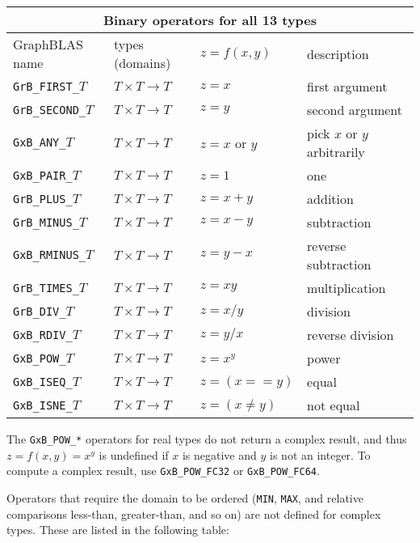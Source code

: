 \documentclass[12pt]{article}
\begin{document}
\vspace{0.2in}
{\footnotesize
\begin{tabular}{|llll|}
\hline
\multicolumn{4}{|c|}{Binary operators for all 13 types} \\
\hline
GraphBLAS name        & types (domains)            & $z=f(x,y)$      & description \\
\hline
\verb'GrB_FIRST_'$T$  & $T \times T \rightarrow T$ & $z = x$         & first argument \\
\verb'GrB_SECOND_'$T$ & $T \times T \rightarrow T$ & $z = y$         & second argument \\
\verb'GxB_ANY_'$T$    & $T \times T \rightarrow T$ & $z = x$ or $y$  & pick $x$ or $y$ arbitrarily \\
\verb'GxB_PAIR_'$T$   & $T \times T \rightarrow T$ & $z = 1$         & one \\
\verb'GrB_PLUS_'$T$   & $T \times T \rightarrow T$ & $z = x+y$       & addition \\
\verb'GrB_MINUS_'$T$  & $T \times T \rightarrow T$ & $z = x-y$       & subtraction \\
\verb'GxB_RMINUS_'$T$ & $T \times T \rightarrow T$ & $z = y-x$       & reverse subtraction \\
\verb'GrB_TIMES_'$T$  & $T \times T \rightarrow T$ & $z = xy$        & multiplication \\
\verb'GrB_DIV_'$T$    & $T \times T \rightarrow T$ & $z = x/y$       & division \\
\verb'GxB_RDIV_'$T$   & $T \times T \rightarrow T$ & $z = y/x$       & reverse division \\
\verb'GxB_POW_'$T$    & $T \times T \rightarrow T$ & $z = x^y$       & power \\
\hline
\verb'GxB_ISEQ_'$T$   & $T \times T \rightarrow T$ & $z = (x == y)$  & equal \\
\verb'GxB_ISNE_'$T$   & $T \times T \rightarrow T$ & $z = (x \ne y)$ & not equal \\
\hline
\end{tabular}
}
\vspace{0.2in}

The \verb'GxB_POW_*' operators for real types do not return a complex result,
and thus $z = f(x,y) = x^y$ is undefined if $x$ is negative and $y$ is not an
integer.  To compute a complex result, use \verb'GxB_POW_FC32' or
\verb'GxB_POW_FC64'.

Operators that require the domain to be ordered (\verb'MIN', \verb'MAX', and
relative comparisons less-than, greater-than, and so on) are not defined for
complex types.  These are listed in the following table:
\end{document}
